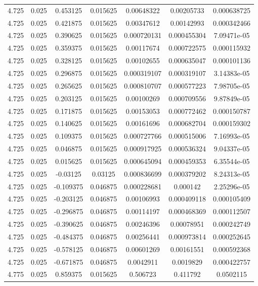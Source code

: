 \begin{flushleft}
\begin{longtable}{ccccccc}
4.725 & 0.025 & 0.453125 & 0.015625 & 0.00648322 & 0.00205733 & 0.000638725  \\ 
4.725 & 0.025 & 0.421875 & 0.015625 & 0.00347612 & 0.00142993 & 0.000342466  \\ 
4.725 & 0.025 & 0.390625 & 0.015625 & 0.000720131 & 0.000455304 & 7.09471e-05  \\ 
4.725 & 0.025 & 0.359375 & 0.015625 & 0.00117674 & 0.000722575 & 0.000115932  \\ 
4.725 & 0.025 & 0.328125 & 0.015625 & 0.00102655 & 0.000635047 & 0.000101136  \\ 
4.725 & 0.025 & 0.296875 & 0.015625 & 0.000319107 & 0.000319107 & 3.14383e-05  \\ 
4.725 & 0.025 & 0.265625 & 0.015625 & 0.000810707 & 0.000577223 & 7.98705e-05  \\ 
4.725 & 0.025 & 0.203125 & 0.015625 & 0.00100269 & 0.000709556 & 9.87849e-05  \\ 
4.725 & 0.025 & 0.171875 & 0.015625 & 0.00153053 & 0.000772462 & 0.000150787  \\ 
4.725 & 0.025 & 0.140625 & 0.015625 & 0.00161696 & 0.000682704 & 0.000159302  \\ 
4.725 & 0.025 & 0.109375 & 0.015625 & 0.000727766 & 0.000515006 & 7.16993e-05  \\ 
4.725 & 0.025 & 0.046875 & 0.015625 & 0.000917925 & 0.000536324 & 9.04337e-05  \\ 
4.725 & 0.025 & 0.015625 & 0.015625 & 0.000645094 & 0.000459353 & 6.35544e-05  \\ 
4.725 & 0.025 & -0.03125 & 0.03125 & 0.000836699 & 0.000379202 & 8.24313e-05  \\ 
4.725 & 0.025 & -0.109375 & 0.046875 & 0.000228681 & 0.000142 & 2.25296e-05  \\ 
4.725 & 0.025 & -0.203125 & 0.046875 & 0.00106993 & 0.000409118 & 0.000105409  \\ 
4.725 & 0.025 & -0.296875 & 0.046875 & 0.00114197 & 0.000468369 & 0.000112507  \\ 
4.725 & 0.025 & -0.390625 & 0.046875 & 0.00246396 & 0.00078951 & 0.000242749  \\ 
4.725 & 0.025 & -0.484375 & 0.046875 & 0.00256441 & 0.000973814 & 0.000252645  \\ 
4.725 & 0.025 & -0.578125 & 0.046875 & 0.00601269 & 0.00161551 & 0.000592368  \\ 
4.725 & 0.025 & -0.671875 & 0.046875 & 0.0042911 & 0.0019829 & 0.000422757  \\ 
4.775 & 0.025 & 0.859375 & 0.015625 & 0.506723 & 0.411792 & 0.0502115  \\ 

\end{longtable}
\end{flushleft}

